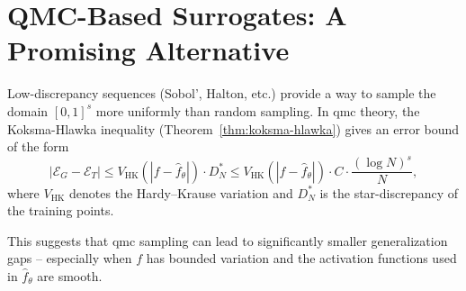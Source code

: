 \section{QMC-Based Surrogates: A Promising Alternative}
Low-discrepancy sequences (Sobol', Halton, etc.) provide a way to sample the
domain $[0,1]^s$ more uniformly than random sampling. In \acl{qmc} theory, the Koksma-Hlawka inequality (Theorem~\ref{thm:koksma-hlawka}) gives an error bound of the form
\begin{equation*}
|\mathcal{E}_G - \mathcal{E}_T| \leq V_{\mathrm{HK}}(|f - \hat{f}_\theta|) \cdot D^*_N \leq  V_{\mathrm{HK}}(|f - \hat{f}_\theta|) \cdot C \cdot \frac{(\log N)^s}{N},
\end{equation*}
where $V_{\mathrm{HK}}$ denotes the Hardy--Krause variation and $D^*_N$ is the
star-discrepancy of the training points.

This suggests that \ac{qmc} sampling can lead to significantly smaller generalization
gaps -- especially when $f$ has bounded variation and the activation functions used
in $\hat{f}_\theta$ are smooth.

